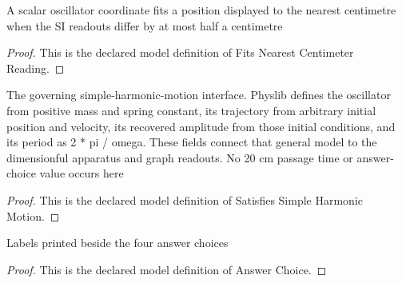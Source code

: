 \begin{definition}
  \label{def:physics:phyx-mini-0717:phyxminiproblems-problemphyxmini0717-fitsnearestcentimeterreading}
  A scalar oscillator coordinate fits a position displayed to the nearest centimetre when the SI readouts differ by at most half a centimetre
\end{definition}
\begin{proof}
  This is the declared model definition of Fits Nearest Centimeter Reading.
\end{proof}
\begin{definition}
  \label{def:physics:phyx-mini-0717:phyxminiproblems-problemphyxmini0717-satisfiessimpleharmonicmotion}
  The governing simple-harmonic-motion interface. Physlib defines the oscillator from positive mass and spring constant, its trajectory from arbitrary initial position and velocity, its recovered amplitude from those initial conditions, and its period as 2 * pi / omega. These fields connect that general model to the dimensionful apparatus and graph readouts. No 20 cm passage time or answer-choice value occurs here
\end{definition}
\begin{proof}
  This is the declared model definition of Satisfies Simple Harmonic Motion.
\end{proof}
\begin{definition}
  \label{def:physics:phyx-mini-0717:phyxminiproblems-problemphyxmini0717-answerchoice}
  Labels printed beside the four answer choices
\end{definition}
\begin{proof}
  This is the declared model definition of Answer Choice.
\end{proof}
